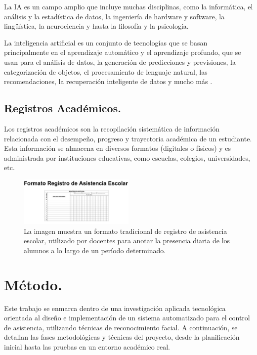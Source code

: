 \documentclass[10pt,a4paper]{article}
\begin{document}
\begin{multicols}{2}
La IA es un campo amplio que incluye muchas disciplinas, como la informática, el análisis y la estadística de datos, la ingeniería de hardware y software, la lingüística, la neurociencia y hasta la filosofía y la psicología.

La inteligencia artificial es un conjunto de tecnologías que se basan principalmente en el aprendizaje automático y el aprendizaje profundo, que se usan para el análisis de datos, la generación de predicciones y previsiones, la categorización de objetos, el procesamiento de lenguaje natural, las recomendaciones, la recuperación inteligente de datos y mucho más \cite{aiIBM}.

\subsection{Registros Académicos.}
Los registros académicos son la recopilación sistemática de información relacionada con el desempeño, progreso y trayectoria académica de un estudiante. Esta información se almacena en diversos formatos (digitales o físicos) y es administrada por instituciones educativas, como escuelas, colegios, universidades, etc\cite{registroAsistenciaUTA}.
\begin{figure}[H]
  \centering
  \includegraphics[width=0.5\textwidth]{imagenes_doc/registroimg.jpg}
  \caption{La imagen muestra un formato tradicional de registro de asistencia escolar, utilizado por docentes para anotar la presencia diaria de los alumnos a lo largo de un período determinado\cite{listaAsistenciaEscolar}.}
  \label{fig:logo}
\end{figure}
\vspace{-1cm}

\section{Método.}
Este trabajo se enmarca dentro de una investigación aplicada tecnológica orientada al diseño e implementación de un sistema automatizado para el control de asistencia, utilizando técnicas de reconocimiento facial. A continuación, se detallan las fases metodológicas y técnicas del proyecto, desde la planificación inicial hasta las pruebas en un entorno académico real.


\end{multicols}
\end{document}
